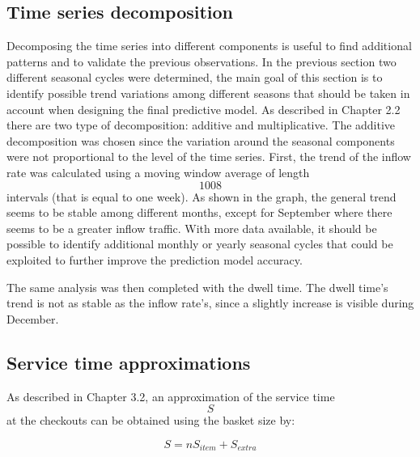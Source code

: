 \subsection{Time series decomposition}
\label{subsec:time_series_decomposition}
Decomposing the time series into different components is useful to find additional patterns and to validate the previous observations. In the previous section two different seasonal cycles were determined, the main goal of this section is to identify possible trend variations among different seasons that should be taken in account when designing the final predictive model. As described in Chapter 2.2 there are two type of decomposition: additive and multiplicative. The additive decomposition was chosen since the variation around the seasonal components were not proportional to the level of the time series.
First, the trend of the inflow rate was calculated using a moving window average of length $$ 1008 $$ intervals (that is equal to one week). As shown in the graph, the general trend seems to be stable among different months, except for September where there seems to be a greater inflow traffic. With more data available, it should be possible to identify additional monthly or yearly seasonal cycles that could be exploited to further improve the prediction model accuracy.

The same analysis was then completed with the dwell time. The dwell time’s trend is not as stable as the inflow rate’s, since a slightly increase is visible during December.

\subsection{Service time approximations}
\label{subsec:service_time_approximations}
As described in Chapter 3.2, an approximation of the service time $$ S $$ at the checkouts can be obtained using the basket size by:

$$ S = n S_{item} + S_{extra} $$


